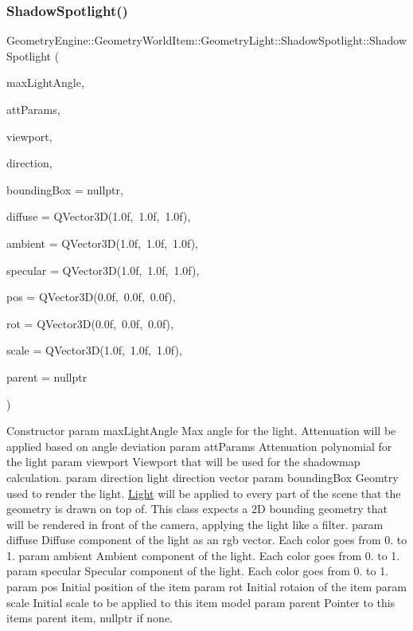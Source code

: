 \subsubsection{\texorpdfstring{ShadowSpotlight()}{ShadowSpotlight()}}
{\footnotesize\ttfamily Geometry\+Engine\+::\+Geometry\+World\+Item\+::\+Geometry\+Light\+::\+Shadow\+Spotlight\+::\+Shadow\+Spotlight (\begin{DoxyParamCaption}\item[{float}]{max\+Light\+Angle,  }\item[{const Q\+Vector3D \&}]{att\+Params,  }\item[{const \mbox{\hyperlink{class_geometry_engine_1_1_geometry_item_utils_1_1_viewport}{Geometry\+Item\+Utils\+::\+Viewport}} \&}]{viewport,  }\item[{const Q\+Vector3D \&}]{direction,  }\item[{\mbox{\hyperlink{class_geometry_engine_1_1_geometry_world_item_1_1_geometry_item_1_1_geometry_item}{Geometry\+Item\+::\+Geometry\+Item}} $\ast$}]{bounding\+Box = {\ttfamily nullptr},  }\item[{const Q\+Vector3D \&}]{diffuse = {\ttfamily QVector3D(1.0f,~1.0f,~1.0f)},  }\item[{const Q\+Vector3D \&}]{ambient = {\ttfamily QVector3D(1.0f,~1.0f,~1.0f)},  }\item[{const Q\+Vector3D \&}]{specular = {\ttfamily QVector3D(1.0f,~1.0f,~1.0f)},  }\item[{const Q\+Vector3D \&}]{pos = {\ttfamily QVector3D(0.0f,~0.0f,~0.0f)},  }\item[{const Q\+Vector3D \&}]{rot = {\ttfamily QVector3D(0.0f,~0.0f,~0.0f)},  }\item[{const Q\+Vector3D \&}]{scale = {\ttfamily QVector3D(1.0f,~1.0f,~1.0f)},  }\item[{\mbox{\hyperlink{class_geometry_engine_1_1_geometry_world_item_1_1_world_item}{World\+Item}} $\ast$}]{parent = {\ttfamily nullptr} }\end{DoxyParamCaption})}

Constructor param max\+Light\+Angle Max angle for the light. Attenuation will be applied based on angle deviation param att\+Params Attenuation polynomial for the light param viewport Viewport that will be used for the shadowmap calculation. param direction light direction vector param bounding\+Box Geomtry used to render the light. \mbox{\hyperlink{class_geometry_engine_1_1_geometry_world_item_1_1_geometry_light_1_1_light}{Light}} will be applied to every part of the scene that the geometry is drawn on top of. This class expects a 2D bounding geometry that will be rendered in front of the camera, applying the light like a filter. param diffuse Diffuse component of the light as an rgb vector. Each color goes from 0. to 1. param ambient Ambient component of the light. Each color goes from 0. to 1. param specular Specular component of the light. Each color goes from 0. to 1. param pos Initial position of the item param rot Initial rotaion of the item param scale Initial scale to be applied to this item model param parent Pointer to this items parent item, nullptr if none. 

